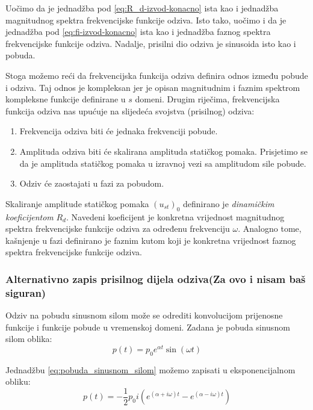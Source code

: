 Uočimo da je jednadžba pod \eqref{eq:R_d-izvod-konacno} ista kao i jednadžba
magnitudnog spektra frekvencijske funkcije odziva. Isto tako, uočimo i da je jednadžba
pod \eqref{eq:fi-izvod-konacno} ista kao i jednadžba faznog spektra frekvencijske
funkcije odziva. Nadalje, prisilni dio odziva je sinusoida isto kao i pobuda.
\par
 
Stoga možemo reći da frekvencijska funkcija odziva definira odnos između pobude i
odziva. Taj odnos je kompleksan jer je opisan magnitudnim i faznim spektrom
kompleksne funkcije definirane u $s$ domeni. Drugim riječima, frekvencijska funkcija
odziva nas upućuje na slijedeća svojstva (prisilnog) odziva:
\begin{enumerate}
    \item Frekvencija odziva biti će jednaka frekvenciji pobude.
    \item Amplituda odziva biti će skalirana amplituda statičkog pomaka. Prisjetimo
        se da je amplituda statičkog pomaka u izravnoj vezi sa amplitudom sile pobude.
    \item Odziv će zaostajati u fazi za pobudom. 
\end{enumerate}

Skaliranje amplitude statičkog pomaka $(u_{st})_0$ definirano je \textit{dinamičkim
koeficijentom} $R_d$. Navedeni koeficijent je konkretna vrijednost magnitudnog
spektra frekvencijske funkcije odziva za određenu frekvenciju $\omega$. Analogno
tome, kašnjenje u fazi definirano je faznim kutom koji je konkretna vrijednost
faznog spektra frekvencijske funkcije odziva.

\subsubsection{Alternativno zapis prisilnog dijela odziva(Za ovo i nisam baš
siguran)}
Odziv na pobudu sinusnom silom može se odrediti konvolucijom prijenosne funkcije i
funkcije pobude u vremenskoj domeni. Zadana je pobuda sinusnom silom oblika:
\begin{equation}\label{eq:pobuda_sinusnom_silom}
    p(t)=p_0e^{\alpha t} \sin(\omega t)
\end{equation}

Jednadžbu \eqref{eq:pobuda_sinusnom_silom} možemo zapisati u eksponencijalnom
obliku:
\begin{equation}\label{eq:pobuda_sinusnom_silom_eksponencijalni}
    p(t)=-\frac{1}{2}p_0i(e^{(\alpha+i\omega)t}-e^{(\alpha-i\omega)t})
\end{equation}

